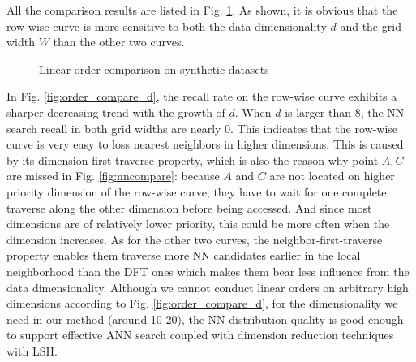 \documentclass[twocolumn]{svjour3}          %
\begin{document}
All the comparison results are listed in Fig. \ref{fig:order_compare_quan}. As shown, it is obvious that the row-wise curve is more sensitive to both the data dimensionality $d$ and the grid width $W$ than the other two curves.
\begin{figure}[t]
	\begin{center}
	\end{center}
	\caption{Linear order comparison on synthetic datasets}\label{fig:order_compare_quan}
\end{figure}

In Fig. \ref{fig:order_compare_d}, the recall rate on the row-wise curve exhibits a sharper decreasing trend with the growth of $d$. When $d$ is larger than 8, the NN search recall in both grid widths are nearly 0. This indicates that the row-wise curve is very easy to loss nearest neighbors in higher dimensions. This is caused by its dimension-first-traverse property, which is also the reason why point $A, C$ are missed in Fig. \ref{fig:nncompare}: because $A$ and $C$ are not located on higher priority dimension of the row-wise curve, they have to wait for one complete traverse along the other dimension before being accessed. And since most dimensions are of relatively lower priority, this could be more often when the dimension increases.
As for the other two curves, the neighbor-first-traverse property enables them traverse more NN candidates earlier in the local neighborhood than the DFT ones which makes them bear less influence from the data dimensionality. Although we cannot conduct linear orders on arbitrary high dimensions according to Fig. \ref{fig:order_compare_d}, for the dimensionality we need in our method (around 10-20), the NN distribution quality is good enough to support effective ANN search coupled with dimension reduction techniques with LSH.
\end{document}
